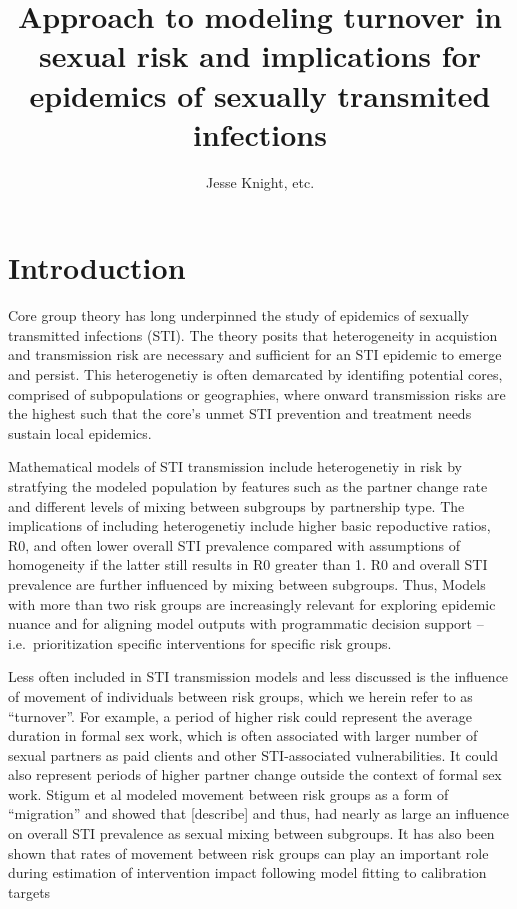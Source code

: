 \documentclass[12pt]{article}
\title{Approach to modeling turnover in sexual risk and implications for epidemics of sexually transmited infections}
\author{Jesse Knight, etc.}
\begin{document}
\maketitle


\section{Introduction}\label{s:intro}
Core group theory has long underpinned the study of epidemics of 
sexually transmitted infections (STI). The theory posits that heterogeneity 
in acquistion and transmission risk are necessary and sufficient for an STI
 epidemic to emerge and persist. This heterogenetiy is often demarcated by 
identifing potential cores, comprised of subpopulations or geographies, 
where onward transmission risks are the highest such that the core's 
unmet STI prevention and treatment needs sustain local epidemics.
\par
Mathematical models of STI transmission include heterogenetiy in risk 
by stratfying the modeled population by features such as the partner 
change rate and different levels of mixing between subgroups by 
partnership type. %
The implications of including heterogenetiy include higher basic 
repoductive ratios, R0, and often lower overall STI prevalence compared 
with assumptions of homogeneity if the latter still results in R0 greater than 1. 
R0 and overall STI prevalence are further influenced by mixing between subgroups.
Thus, Models with more than two risk groups
are increasingly relevant for exploring epidemic nuance
and for aligning model outputs with programmatic decision support
-- i.e.\ prioritization specific interventions for specific risk groups. %
\par
Less often included in STI transmission models 
and less discussed is the influence of movement of 
individuals between risk groups, which we herein refer to as ``turnover''.%
For example, a period of higher risk could represent the average duration
in formal sex work, which is often associated with larger number of sexual partners
as paid clients and other STI-associated vulnerabilities. %
It could also represent periods of higher partner change outside
the context of formal sex work. %
Stigum et al modeled movement between risk groups as a form
of ``migration'' and showed that [describe] and thus, had nearly as large
an influence on overall STI prevalence as sexual mixing between
subgroups. %
It has also been shown that rates of movement between risk groups
can play an important role during estimation of intervention impact
following model fitting to calibration targets%
\end{document}

